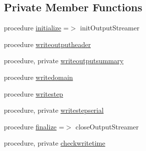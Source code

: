 \subsection*{Private Member Functions}
\begin{DoxyCompactItemize}
\item 
procedure \mbox{\hyperlink{structsimulationoutputstreamer__mod_1_1output__streamer__class_aef05ba910aa8ebe5567fae9d59989dd1}{initialize}} =$>$ init\+Output\+Streamer
\item 
procedure \mbox{\hyperlink{structsimulationoutputstreamer__mod_1_1output__streamer__class_a790aab2b95d7f236ae4c66e4456b641e}{writeoutputheader}}
\item 
procedure, private \mbox{\hyperlink{structsimulationoutputstreamer__mod_1_1output__streamer__class_ae54b9ad37209fc6cafb8c80ca70d73c3}{writeoutputsummary}}
\item 
procedure \mbox{\hyperlink{structsimulationoutputstreamer__mod_1_1output__streamer__class_a4013e6853675f44c7df2409114da35d2}{writedomain}}
\item 
procedure \mbox{\hyperlink{structsimulationoutputstreamer__mod_1_1output__streamer__class_a26f4f2807f3e0d0067db555e1351b04e}{writestep}}
\item 
procedure, private \mbox{\hyperlink{structsimulationoutputstreamer__mod_1_1output__streamer__class_a8b9e10001cb0aa3315f94647c59bb941}{writestepserial}}
\item 
procedure \mbox{\hyperlink{structsimulationoutputstreamer__mod_1_1output__streamer__class_a3c178b135b90289720d9cb549fa8dce2}{finalize}} =$>$ close\+Output\+Streamer
\item 
procedure, private \mbox{\hyperlink{structsimulationoutputstreamer__mod_1_1output__streamer__class_a2085a877c0b95c662c0012d911e34c58}{checkwritetime}}
\end{DoxyCompactItemize}
